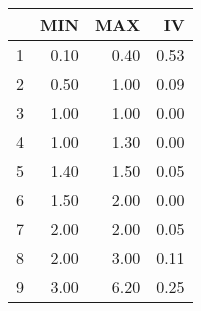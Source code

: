 \begin{table}[ht]
\centering
\begin{tabular}{rrrr}
  \hline
 & MIN & MAX & IV \\ 
  \hline
1 & 0.10 & 0.40 & 0.53 \\ 
  2 & 0.50 & 1.00 & 0.09 \\ 
  3 & 1.00 & 1.00 & 0.00 \\ 
  4 & 1.00 & 1.30 & 0.00 \\ 
  5 & 1.40 & 1.50 & 0.05 \\ 
  6 & 1.50 & 2.00 & 0.00 \\ 
  7 & 2.00 & 2.00 & 0.05 \\ 
  8 & 2.00 & 3.00 & 0.11 \\ 
  9 & 3.00 & 6.20 & 0.25 \\ 
   \hline
\end{tabular}
\end{table}
